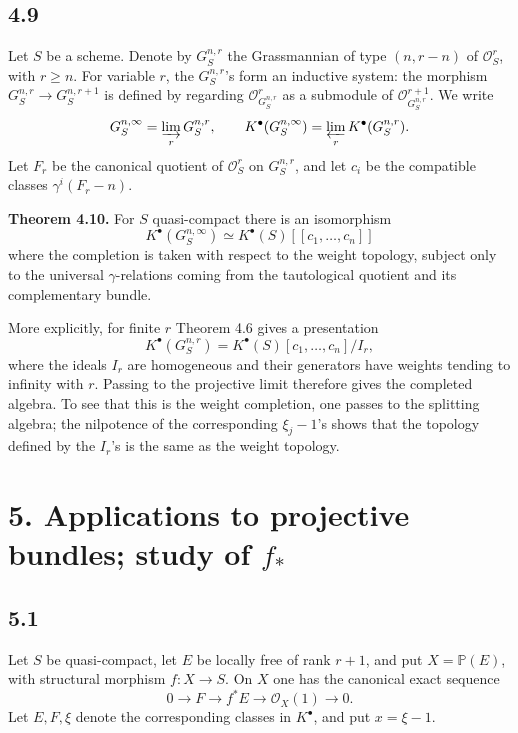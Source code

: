 \documentclass[11pt]{article}
\begin{document}
\subsection*{4.9}
Let \(S\) be a scheme. Denote by \(G_S^{n,r}\) the Grassmannian of type \((n,r-n)\) of \(\mathcal O_S^r\), with \(r\geq n\). For variable \(r\), the \(G_S^{n,r}\)'s form an inductive system: the morphism \(G_S^{n,r}\to G_S^{n,r+1}\) is defined by regarding \(\mathcal O_{G_S^{n,r}}^r\) as a submodule of \(\mathcal O_{G_S^{n,r}}^{r+1}\). We write
\[
  G_S^{n,\infty}=\varinjlim_r G_S^{n,r},
  \qquad
  K^\bullet(G_S^{n,\infty})=\varprojlim_r K^\bullet(G_S^{n,r}).
\]
Let \(F_r\) be the canonical quotient of \(\mathcal O_S^r\) on \(G_S^{n,r}\), and let \(c_i\) be the compatible classes \(\gamma^i(F_r-n)\).

\textbf{Theorem 4.10.} For \(S\) quasi-compact there is an isomorphism
\[
  K^\bullet(G_S^{n,\infty})\simeq K^\bullet(S)[[c_1,\ldots,c_n]]
\]
where the completion is taken with respect to the weight topology, subject only to the universal \(\gamma\)-relations coming from the tautological quotient and its complementary bundle.

More explicitly, for finite \(r\) Theorem 4.6 gives a presentation
\[
  K^\bullet(G_S^{n,r})=K^\bullet(S)[c_1,\ldots,c_n]/I_r,
\]
where the ideals \(I_r\) are homogeneous and their generators have weights tending to infinity with \(r\). Passing to the projective limit therefore gives the completed algebra. To see that this is the weight completion, one passes to the splitting algebra; the nilpotence of the corresponding \(\xi_j-1\)'s shows that the topology defined by the \(I_r\)'s is the same as the weight topology.

\section*{5. Applications to projective bundles; study of \(f_*\)}

\subsection*{5.1}
Let \(S\) be quasi-compact, let \(E\) be locally free of rank \(r+1\), and put \(X=\mathbb P(E)\), with structural morphism \(f:X\to S\). On \(X\) one has the canonical exact sequence
\[
  0\longrightarrow F\longrightarrow f^*E\longrightarrow \mathcal O_X(1)\longrightarrow 0.
\]
Let \(E,F,\xi\) denote the corresponding classes in \(K^\bullet\), and put \(x=\xi-1\).
\end{document}
